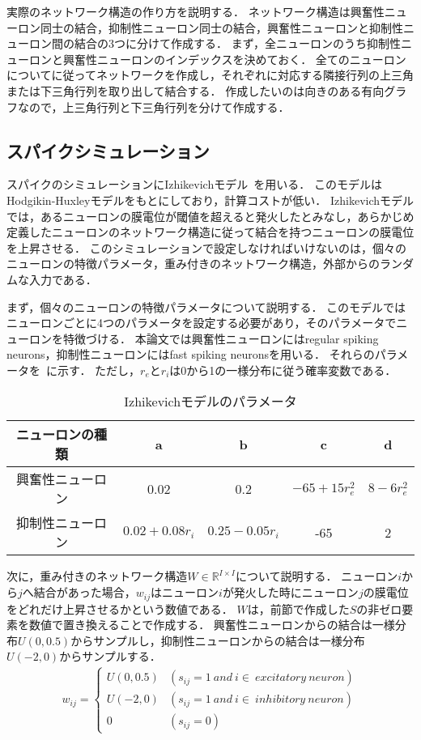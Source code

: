 実際のネットワーク構造の作り方を説明する．
ネットワーク構造は興奮性ニューロン同士の結合，抑制性ニューロン同士の結合，興奮性ニューロンと抑制性ニューロン間の結合の3つに分けて作成する．
まず，全ニューロンのうち抑制性ニューロンと興奮性ニューロンのインデックスを決めておく．
全てのニューロンについてに従ってネットワークを作成し，それぞれに対応する隣接行列の上三角または下三角行列を取り出して結合する．
作成したいのは向きのある有向グラフなので，上三角行列と下三角行列を分けて作成する．

\subsection{スパイクシミュレーション}
スパイクのシミュレーションにIzhikevichモデル~\cite{Izhikevich2003}を用いる．
このモデルはHodgikin-Huxleyモデルをもとにしており，計算コストが低い．
Izhikevichモデルでは，あるニューロンの膜電位が閾値を超えると発火したとみなし，あらかじめ定義したニューロンのネットワーク構造に従って結合を持つニューロンの膜電位を上昇させる．
このシミュレーションで設定しなければいけないのは，個々のニューロンの特徴パラメータ，重み付きのネットワーク構造，外部からのランダムな入力である．

まず，個々のニューロンの特徴パラメータについて説明する．
このモデルではニューロンごとに4つのパラメータを設定する必要があり，そのパラメータでニューロンを特徴づける．
本論文では興奮性ニューロンにはregular spiking neurons，抑制性ニューロンにはfast spiking neuronsを用いる．
それらのパラメータを~に示す．
ただし，$r_e$と$r_i$は0から1の一様分布に従う確率変数である．

\begin{table}[htb]
  \center
  \begin{tabular}{|c|cccc|} \hline
    ニューロンの種類 & a & b & c & d \\ \hline
    興奮性ニューロン & 0.02 & 0.2 & $-65 + 15 r_e^2$ & $8 - 6r_e^2$ \\
    抑制性ニューロン & $0.02 + 0.08r_i$ & $0.25 - 0.05 r_i$ & -65 & 2 \\ \hline
  \end{tabular}
  \caption{Izhikevichモデルのパラメータ}
  \label{tab:parameter2}
\end{table}

次に，重み付きのネットワーク構造$W \in \mathbb{R}^{I \times I}$について説明する．
ニューロン$i$から$j$へ結合があった場合，$w_{ij}$はニューロン$i$が発火した時にニューロン$j$の膜電位をどれだけ上昇させるかという数値である．
$W$は，前節で作成した$S$の非ゼロ要素を数値で置き換えることで作成する．
興奮性ニューロンからの結合は一様分布$U(0, 0.5)$からサンプルし，抑制性ニューロンからの結合は一様分布$U(-2,0)$からサンプルする．
\begin{align}
	w_{ij} = \begin{cases}
		U(0,0.5) & (s_{ij} = 1 \ and \ i \in \ excitatory \ neuron) \\
		U(-2,0) & (s_{ij} = 1 \ and \ i \in \ inhibitory\  neuron) \\
		0 & (s_{ij} = 0)
  \end{cases}
	\label{eq:W}
\end{align}

